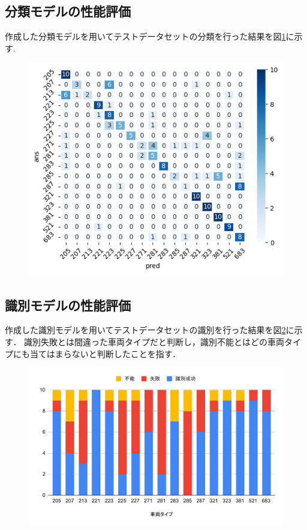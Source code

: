 \begin{multicols*}{2}
\subsection{分類モデルの性能評価}
作成した分類モデルを用いてテストデータセットの分類を行った結果を図\ref{fig:classifyresults}に示す.
\begin{figure}
	\centering
	\includegraphics[width=\linewidth]{obj/classify_results.pdf}
	\label{fig:classifyresults}
\end{figure}

\subsection{識別モデルの性能評価}
作成した識別モデルを用いてテストデータセットの識別を行った結果を図\ref{fig:chartdet}に示す．
識別失敗とは間違った車両タイプだと判断し，識別不能とはどの車両タイプにも当てはまらないと判断したことを指す．
\begin{figure}
	\centering
	\includegraphics[width=\linewidth]{obj/chartDET.pdf}
	\label{fig:chartdet}
\end{figure}






\end{multicols*}
